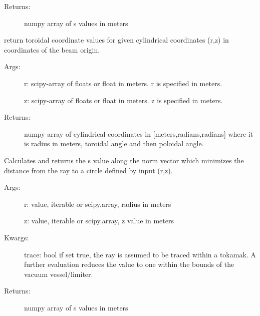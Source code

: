 \documentclass[letterpaper,10pt,english]{sphinxmanual}
\begin{document}
\begin{fulllineitems}
\begin{fulllineitems}
\begin{description}
\item[{Returns:}] \leavevmode
numpy array of s values in meters

\end{description}

\end{fulllineitems}


\begin{fulllineitems}
\label{TRIPPy:TRIPPy.beam.Beam.t}
return toroidal coordinate values for given cylindrical
coordinates (r,z) in coordinates of the beam origin.
\begin{description}
\item[{Args:}] \leavevmode
r: scipy-array of floats or float in meters. r is
specified in meters.

z: scipy-array of floats or float in meters. z is
specified in meters.

\item[{Returns:}] \leavevmode
numpy array of cylindrical coordinates in {[}meters,radians,radians{]}
where it is radius in meters, toroidal angle and then poloidal angle.

\end{description}

\end{fulllineitems}


\begin{fulllineitems}
\label{TRIPPy:TRIPPy.beam.Beam.tmin}
Calculates and returns the s value along the norm vector
which minimizes the distance from the ray to a circle defined by
input (r,z).
\begin{description}
\item[{Args:}] \leavevmode
r: value, iterable or scipy.array, radius in meters

z: value, iterable or scipy.array, z value in meters

\item[{Kwargs:}] \leavevmode
trace: bool if set true, the ray is assumed to be traced within a
tokamak.  A further evaluation reduces the value to one within
the bounds of the vacuum vessel/limiter.

\item[{Returns:}] \leavevmode
numpy array of s values in meters


\end{description}
\end{fulllineitems}
\end{fulllineitems}
\end{document}
